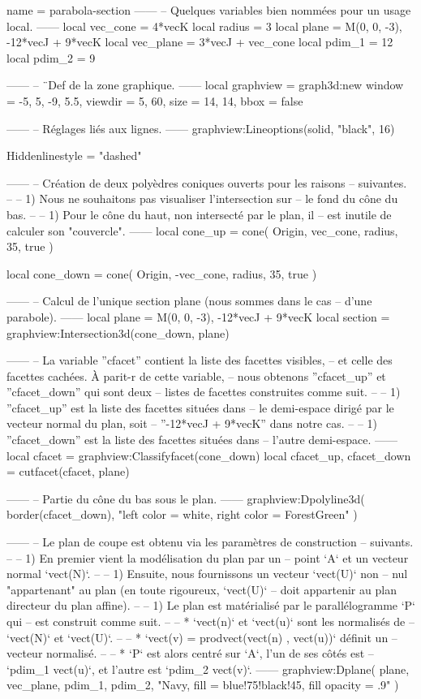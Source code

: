 \documentclass[border = 3pt]{standalone}
\begin{document}
\begin{luadraw*}{name = parabola-section}
------
-- Quelques variables bien nommées pour un usage local.
------
local vec_cone  = 4*vecK
local radius  = 3
local plane   = {M(0, 0, -3), -12*vecJ + 9*vecK}
local vec_plane = 3*vecJ + vec_cone
local pdim_1  = 12
local pdim_2  = 9

------
-- ¨Def de la zone graphique.
------
local graphview = graph3d:new{
  window  = {-5, 5, -9, 5.5},
  viewdir = {5, 60},
  size    = {14, 14},
  bbox    = false
}

------
-- Réglages liés aux lignes.
------
graphview:Lineoptions(solid, "black", 16)

Hiddenlinestyle = "dashed"

------
-- Création de deux polyèdres coniques ouverts pour les raisons
-- suivantes.
--
--     1) Nous ne souhaitons pas visualiser l'intersection sur
--     le fond du cône du bas.
--
--     1) Pour le cône du haut, non intersecté par le plan, il
--     est inutile de calculer son "couvercle".
------
local cone_up = cone(
  Origin, vec_cone, radius,
  35,
  true
)

local cone_down = cone(
  Origin, -vec_cone, radius,
  35,
  true
)

------
-- Calcul de l'unique section plane (nous sommes dans le cas
-- d'une parabole).
------
local plane   = {M(0, 0, -3), -12*vecJ + 9*vecK}
local section = graphview:Intersection3d(cone_down, plane)

------
-- La variable ''cfacet'' contient la liste des facettes visibles,
-- et celle des facettes cachées. À parit-r de cette variable,
-- nous obtenons ''cfacet_up'' et ''cfacet_down'' qui sont deux
-- listes de facettes construites comme suit.
--
--   1) ''cfacet_up'' est la liste des facettes situées dans
--   le demi-espace dirigé par le vecteur normal du plan, soit
--   ''-12*vecJ + 9*vecK'' dans notre cas.
--
--   1) ''cfacet_down'' est la liste des facettes situées dans
--   l’autre demi-espace.
------
local cfacet                 = graphview:Classifyfacet(cone_down)
local cfacet_up, cfacet_down = cutfacet(cfacet, plane)

------
-- Partie du cône du bas sous le plan.
------
graphview:Dpolyline3d(
  border(cfacet_down),
  "left color = white, right color = ForestGreen"
)

------
-- Le plan de coupe est obtenu via les paramètres de construction
-- suivants.
--
--     1) En premier vient la modélisation du plan par un
--     point `A` et un vecteur normal `vect(N)`.
--
--     1) Ensuite, nous fournissons un vecteur `vect(U)` non
--     nul "appartenant" au plan (en toute rigoureux, `vect(U)`
--     doit appartenir au plan directeur du plan affine).
--
--     1) Le plan est matérialisé par le parallélogramme `P` qui
--     est construit comme suit.
--
--         * `vect(n)` et `vect(u)` sont les normalisés de
--         `vect(N)` et `vect(U)`.
--
--         * `vect(v) = prodvect(vect(n) , vect(u))` définit un
--         vecteur normalisé.
--
--         * `P` est alors centré sur `A`, l'un de ses côtés est
--         `pdim_1 vect(u)`, et l'autre est `pdim_2 vect(v)`.
------
graphview:Dplane(
  plane,
  vec_plane, pdim_1, pdim_2,
  "Navy, fill = blue!75!black!45, fill opacity = .9"
)


\end{luadraw*}
\end{document}
